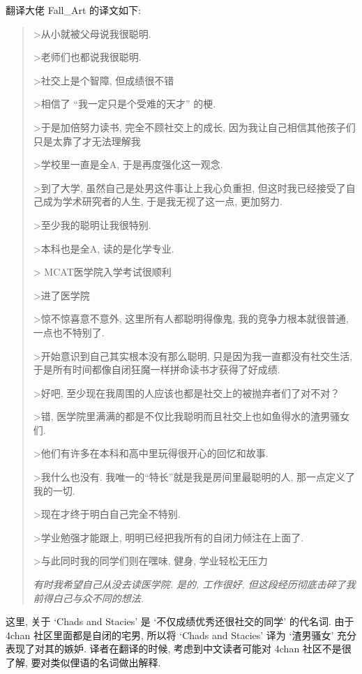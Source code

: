 \documentclass[a4paper, 12pt, UTF8]{article}
\begin{document}
    翻译大佬 Fall\_Art 的译文如下:

\begin{quote}
    >从小就被父母说我很聪明.
    
    >老师们也都说我很聪明.
    
    >社交上是个智障, 但成绩很不错 
    
    >相信了 ``我一定只是个受难的天才'' 的梗. 
    
    >于是加倍努力读书, 完全不顾社交上的成长, 因为我让自己相信其他孩子们只是太靠了才无法理解我
    
    >学校里一直是全A, 于是再度强化这一观念. 
    
    >到了大学, 虽然自己是处男这件事让上我心负重担, 但这时我已经接受了自己成为学术研究者的人生, 于是我无视了这一点, 更加努力. 
    
    >至少我的聪明让我很特别. 
    
    >本科也是全A, 读的是化学专业. 
    
    > MCAT医学院入学考试很顺利
    
    >进了医学院
    
    >惊不惊喜意不意外, 这里所有人都聪明得像鬼, 我的竞争力根本就很普通, 一点也不特别了. 
    
    >开始意识到自己其实根本没有那么聪明, 只是因为我一直都没有社交生活, 于是所有时间都像自闭狂魔一样拼命读书才获得了好成绩.
    
    >好吧, 至少现在我周围的人应该也都是社交上的被抛弃者们了对不对？
    
    >错, 医学院里满满的都是不仅比我聪明而且社交上也如鱼得水的渣男骚女们. 
    
    >他们有许多在本科和高中里玩得很开心的回忆和故事. 
    
    >我什么也没有. 我唯一的“特长”就是我是房间里最聪明的人, 那一点定义了我的一切.
    
    >现在才终于明白自己完全不特别.
    
    >学业勉强才能跟上, 明明已经把我所有的自闭力倾注在上面了.
    
    >与此同时我的同学们则在嘿味, 健身, 学业轻松无压力
    
    \emph{有时我希望自己从没去读医学院. 是的, 工作很好, 但这段经历彻底击碎了我前得白己与众不同的想法.}
\end{quote}

这里, 关于 `Chads and Stacies' 是 `不仅成绩优秀还很社交的同学' 的代名词. 由于 4chan 社区里面都是自闭的宅男, 所以将 `Chads and Stacies' 译为 `渣男骚女' 充分表现了对其的嫉妒. 译者在翻译的时候, 考虑到中文读者可能对 4chan 社区不是很了解, 要对类似俚语的名词做出解释.
\end{document}
